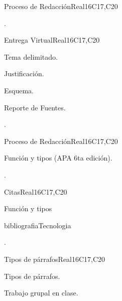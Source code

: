 \begin{syllabus}
\begin{unit}{Proceso de Redacción}{}{Real}{16}{C17,C20}
  \begin{learningoutcomes}
   \item .%
  \end{learningoutcomes}
\end{unit}

\begin{unit}{Entrega Virtual}{}{Real}{16}{C17,C20}
  \begin{topics}
      \item Tema delimitado.
      \item Justificación.
      \item Esquema.
      \item Reporte de Fuentes.
  \end{topics}

  \begin{learningoutcomes}
   \item .%
  \end{learningoutcomes}
\end{unit}

\begin{unit}{Proceso de Redacción}{}{Real}{16}{C17,C20}
  \begin{topics}
      \item Función y tipos (APA 6ta edición).
  \end{topics}

  \begin{learningoutcomes}
   \item .%
  \end{learningoutcomes}
\end{unit}

\begin{unit}{Citas}{}{Real}{16}{C17,C20}
  \begin{topics}
      \item Función y tipos
      \item bibliografiaTecnologia
  \end{topics}

  \begin{learningoutcomes}
   \item .%
  \end{learningoutcomes}
\end{unit}

\begin{unit}{Tipos de párrafos}{}{Real}{16}{C17,C20}
  \begin{topics}
      \item Tipos de párrafos.
      \item Trabajo grupal en clase.
  \end{topics}


\end{unit}
\end{syllabus}
